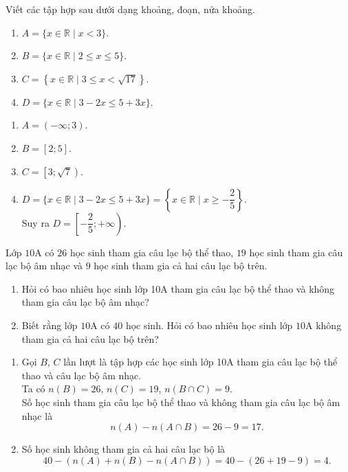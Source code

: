 \begin{bt}%
    Viết các tập hợp sau dưới dạng khoảng, đoạn, nửa khoảng.
    \begin{enumerate}
        \item $A=\{x \in \mathbb{R} \mid x<3\}$.
        \item $B=\{x \in \mathbb{R} \mid 2 \leq x \leq 5\}$.
        \item $C=\left\{x \in \mathbb{R} \mid 3 \leq x<\sqrt{17}\right\}$.
        \item $D=\{x \in \mathbb{R} \mid 3-2 x \leq 5+3 x\}$.
    \end{enumerate}
    \loigiai
    {
          \begin{enumerate}
            \item $A=(-\infty;3)$.
            \item $B=[2;5]$.
            \item $C=\left[3;\sqrt{7}\right)$.
            \item $D=\{x \in \mathbb{R} \mid 3-2 x \leq 5+3 x\}=\left\{x \in \mathbb{R} \mid x \geq - \dfrac{2}{5}\right\}$.\\
            Suy ra $D=\left[-\dfrac{2}{5};+\infty\right)$.
        \end{enumerate}
    }
\end{bt}
\begin{bt}%
     Lớp $10 \mathrm{A}$ có $26$ học sinh tham gia câu lạc bộ thể thao, $19$ học sinh tham gia câu lạc bộ âm nhạc và $9$ học sinh tham gia cả hai câu lạc bộ trên.
     \begin{enumerate}
         \item Hỏi có bao nhiêu học sinh lớp 10A tham gia câu lạc bộ thể thao và không tham gia câu lạc bộ âm nhạc?
         \item Biết rằng lớp $10 \mathrm{A}$ có $40$ học sinh. Hỏi có bao nhiêu học sinh lớp $10 \mathrm{A}$ không tham gia cả hai câu lạc bộ trên?
     \end{enumerate}

    \loigiai
    {
         \begin{enumerate}
            \item Gọi $B$, $C$ lần lượt là tập hợp các học sinh lớp 10A tham gia câu lạc bộ thể thao và câu lạc bộ âm nhạc.\\
            Ta có $n(B)=26$, $n(C)=19$, $n(B\cap C)=9$.\\
            Số học sinh tham gia câu lạc bộ thể thao và không tham gia câu lạc bộ âm nhạc là $$n(A)-n(A\cap B)=26-9=17.$$
            \item Số học sinh không tham gia cả hai câu lạc bộ là $$40-(n(A)+n(B)-n(A\cap B))=40-(26+19-9)=4.$$
        \end{enumerate}
    }
\end{bt}

